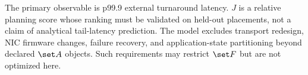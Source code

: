 The primary observable is p99.9 external turnaround latency. $J$ is a relative planning score whose ranking must be validated on held-out placements, not a claim of analytical tail-latency prediction. The model excludes transport redesign, NIC firmware changes, failure recovery, and application-state partitioning beyond declared $\set A$ objects. Such requirements may restrict $\set F$ but are not optimized here.
